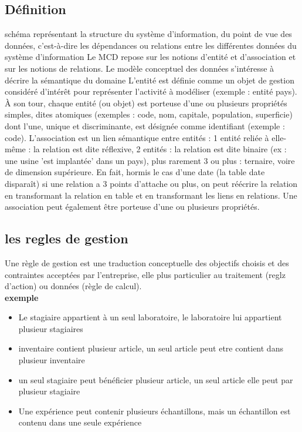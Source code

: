 \subsection{Définition}
schéma représentant la structure du système d'information, du point de vue des
données, c'est-à-dire les dépendances ou relations entre les différentes données
du système d'information
Le MCD repose sur les notions d'entité et d'association et sur les notions de
relations. Le modèle conceptuel des données s'intéresse à décrire la sémantique
du domaine
L'entité est définie comme un objet de gestion considéré d'intérêt pour
représenter l'activité à modéliser (exemple : entité pays). À son tour, chaque
entité (ou objet) est porteuse d'une ou plusieurs propriétés simples, dites
atomiques (exemples : code, nom, capitale, population, superficie) dont l'une,
unique et discriminante, est désignée comme identifiant (exemple : code).
L'association est un lien sémantique entre entités :
 1 entité reliée à elle-même : la relation est dite réflexive,
 2 entités : la relation est dite binaire (ex : une usine 'est implantée' dans
un pays),
 plus rarement 3 ou plus : ternaire, voire de dimension supérieure. En fait,
hormis le cas d'une date (la table date disparaît) si une relation a 3 points
d'attache ou plus, on peut réécrire la relation en transformant la relation
en table et en transformant les liens en relations.
Une association peut également être porteuse d'une ou plusieurs propriétés.
\subsection{les regles de gestion}
Une règle de gestion est une traduction conceptuelle des objectifs choisis et des contraintes acceptées par l'entreprise,  elle plus particulier au traitement (reglz d'action) ou données (règle de calcul).\\
\textbf{exemple}
\begin{itemize}
    \item Le stagiaire appartient à un seul laboratoire, le laboratoire lui appartient plusieur stagiaires
    \item inventaire contient plusieur article, un seul article peut etre contient dans plusieur inventaire
    \item un seul stagiaire peut bénéficier plusieur article, un seul article elle peut par plusieur stagiaire
    \item Une expérience peut contenir plusieurs échantillons, mais un échantillon est contenu dans une seule expérience
\end{itemize}
